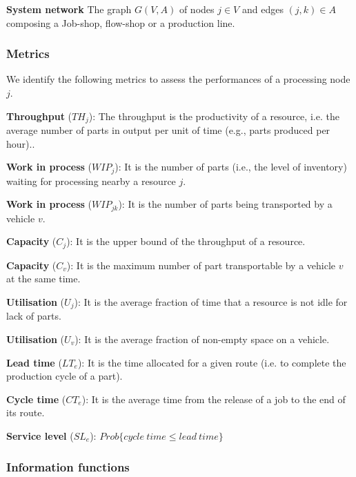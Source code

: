 \textbf{System network} The graph $G(V,A)$ of nodes $j\in V$ and edges $\left(j,k\right)\in A$ composing a Job-shop, flow-shop or a production line.

\subsubsection{Metrics}
We identify the following metrics to assess the performances of a processing node $j$.\par

\textbf{Throughput} ($TH_{j}$): The throughput is the productivity of a resource, i.e. the average number of parts in output per unit of time (e.g., parts produced per hour)..\par

\textbf{Work in process} ($WIP_{j}$): It is the number of parts (i.e., the level of inventory) waiting for processing nearby a resource $j$.\par

\textbf{Work in process} ($WIP_{jk}$): It is the number of parts being transported by a vehicle $v$. \par

\textbf{Capacity} ($C_j$): It is the upper bound of the throughput of a resource.\par

\textbf{Capacity} ($C_v$): It is the maximum number of part transportable by a vehicle $v$ at the same time. \par

\textbf{Utilisation} ($U_j$): It is the average fraction of time that a resource is not idle for lack of parts. \par

\textbf{Utilisation} ($U_v$): It is the average fraction of non-empty space on a vehicle. \par

\textbf{Lead time} ($LT_e$): It is the time allocated for a given route (i.e. to complete the production cycle of a part). \par

\textbf{Cycle time} ($CT_e$): It is the average time from the release of a job to the end of its route. \par

\textbf{Service level} ($SL_e$): $Prob\{cycle\ time\le lead\ time\}$

\subsubsection{Information functions}

